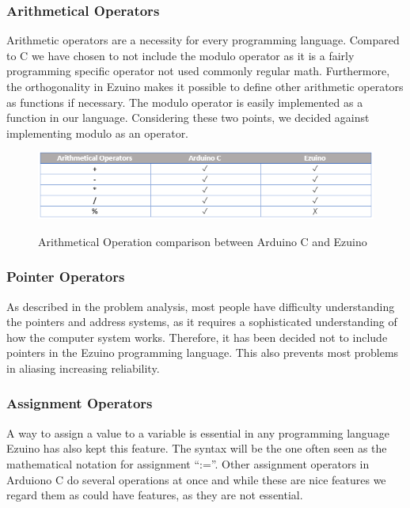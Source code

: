 \subsubsection*{Arithmetical Operators}
Arithmetic operators are a necessity for every programming language.
Compared to C we have chosen to not include the modulo operator as it is a fairly programming specific operator not used commonly regular math. Furthermore, the orthogonality in Ezuino makes it possible to define other arithmetic operators as functions if necessary. The modulo operator is easily implemented as a function in our language. Considering these two points, we decided against implementing modulo as an operator.
\begin{figure}[H]
\centering
\caption{Arithmetical Operation comparison between Arduino C and Ezuino}
\includegraphics[scale=0.60]{figures/language_features/langf05.png}
\label{lf05}
\end{figure}

\subsubsection*{Pointer Operators}
As described in the problem analysis, most people have difficulty understanding the pointers and address systems, as it requires a sophisticated understanding of how the computer system works. Therefore, it has been decided not to include pointers in the Ezuino programming language. This also prevents most problems in aliasing increasing reliability.
\subsubsection*{Assignment Operators}
A way to assign a value to a variable is essential in any programming language Ezuino has also kept this feature. The syntax will be the one often seen as the mathematical notation for assignment “:=”. Other assignment operators in Arduiono C do several operations at once and while these are nice features we regard them as could have features, as they are not essential.
